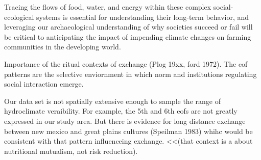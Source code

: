 \documentclass[fleqn,10pt]{wlscirep}
\begin{document}
Tracing the flows of food, water, and energy within these complex social-ecological systems is essential for understanding their long-term behavior, and leveraging our archaeological understanding of why societies succeed or fail will be critical to anticipating the impact of impending climate changes on farming communities in the developing world.

Importance of the ritual contexts of exchange (Plog 19xx, ford 1972). The eof patterns are the selective enviornment in which norm and institutions regulating social interaction emerge. 

Our data set is not spatially extensive enough to sample the range of hydroclimate veraibility. For example, the 5th and 6th eofs are not greatly expressed in our study area. But there is evidence for long distance exchange between new mexico and great plains cultures (Speilman 1983) whihc would be consistent with that pattern influenceing exchange. <<(that context is a about nutritional mutualism, not risk reduction).





\end{document}

